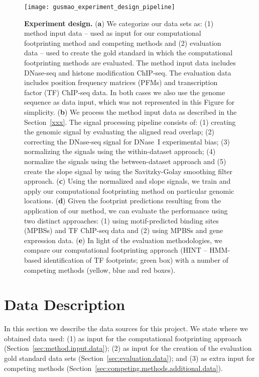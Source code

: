 \begin{figure}[h!]
\centering
\texttt{[image: gusmao\_experiment\_design\_pipeline]}
\caption[Experiment design]{\textbf{Experiment design.} (\textbf{a}) We categorize our data sets as: (1) method input data -- used as input for our computational footprinting method and competing methods and (2) evaluation data -- used to create the gold standard in which the computational footprinting methods are evaluated. The method input data includes DNase-seq and histone modification ChIP-seq. The evaluation data includes position frequency matrices (PFMs) and transcription factor (TF) ChIP-seq data. In both cases we also use the genome sequence as data input, which was not represented in this Figure for simplicity. (\textbf{b}) We process the method input data as described in the Section~\ref{xxx}. The signal processing pipeline consists of: (1) creating the genomic signal by evaluating the aligned read overlap; (2) correcting the DNase-seq signal for DNase~I experimental bias; (3) normalizing the signals using the within-dataset approach; (4) normalize the signals using the between-dataset approach and (5) create the slope signal by using the Savitzky-Golay smoothing filter approach. (\textbf{c}) Using the normalized and slope signals, we train and apply our computational footprinting method on particular genomic locations. (\textbf{d}) Given the footprint predictions resulting from the application of our method, we can evaluate the performance using two distinct approaches: (1) using motif-predicted binding sites (MPBSs) and TF ChIP-seq data and (2) using MPBSs and gene expression data. (\textbf{e}) In light of the evaluation methodologies, we compare our computational footprinting approach (HINT -- HMM-based identification of TF footprints; green box) with a number of competing methods (yellow, blue and red boxes).}
\label{fig:gusmao_experiment_design_pipeline}
\end{figure}

\section{Data Description}
\label{sec:data.description}

In this section we describe the data sources for this project. We state where we obtained data used: (1) as input for the computational footprinting approach (Section~\ref{sec:method.input.data}); (2) as input for the creation of the evaluation gold standard data sets (Section~\ref{sec:evaluation.data}); and (3) as extra input for competing methods (Section~\ref{sec:competing.methods.additional.data}).

